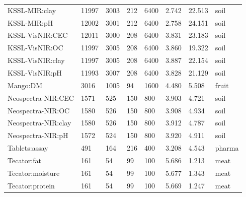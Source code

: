 \begin{tabular}{llllllll}
KSSL-MIR:clay & 11997 & 3003 & 212 & 6400 & 2.742 & 22.513 & soil \\
KSSL-MIR:pH & 12002 & 3001 & 212 & 6400 & 2.758 & 24.151 & soil \\
KSSL-VisNIR:CEC & 12011 & 3000 & 208 & 6400 & 3.831 & 23.183 & soil \\
KSSL-VisNIR:OC & 11997 & 3005 & 208 & 6400 & 3.860 & 19.322 & soil \\
KSSL-VisNIR:clay & 11997 & 3005 & 208 & 6400 & 3.887 & 22.154 & soil \\
KSSL-VisNIR:pH & 11993 & 3007 & 208 & 6400 & 3.828 & 21.129 & soil \\
Mango:DM & 3016 & 1005 & 94 & 1600 & 4.480 & 5.508 & fruit \\
Neospectra-NIR:CEC & 1571 & 525 & 150 & 800 & 3.903 & 4.721 & soil \\
Neospectra-NIR:OC & 1580 & 526 & 150 & 800 & 3.908 & 4.934 & soil \\
Neospectra-NIR:clay & 1580 & 526 & 150 & 800 & 3.912 & 4.787 & soil \\
Neospectra-NIR:pH & 1572 & 524 & 150 & 800 & 3.920 & 4.911 & soil \\
Tablets:assay & 491 & 164 & 216 & 400 & 3.208 & 4.543 & pharma \\
Tecator:fat & 161 & 54 & 99 & 100 & 5.686 & 1.213 & meat \\
Tecator:moisture & 161 & 54 & 99 & 100 & 5.677 & 1.343 & meat \\
Tecator:protein & 161 & 54 & 99 & 100 & 5.669 & 1.247 & meat \\
\hline
\end{tabular}
